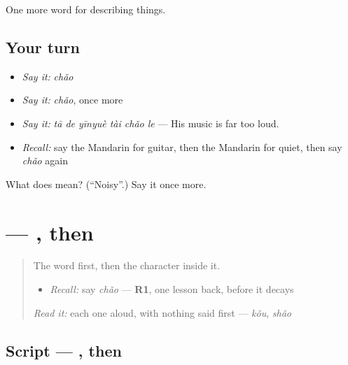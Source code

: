 \begin{grammarlens}[title={What you've built}]
One more word for describing things.
\end{grammarlens}

\subsection*{Your turn}
\begin{itemize}
\raggedright
  \item \emph{Say it:} \emph{chǎo}
  \item \emph{Say it:} \emph{chǎo}, once more
  \item \emph{Say it:} \emph{tā de yīnyuè tài chǎo le} — His music is far too loud.
  \item \emph{Recall:} say the Mandarin for guitar, then the Mandarin for quiet, then say \emph{chǎo} again
\end{itemize}

\begin{tcolorbox}[breakable,colback=teal!4,colframe=teal!35!black,title={Before you move on}]
What does  mean? (\textquotedblleft{}Noisy\textquotedblright{}.) Say it once more.
\end{tcolorbox}
\section[\texorpdfstring{\zh{吵} (chǎo)}{吵 (chǎo)}]{ — , then }

\label{lesson:ZH-W129-chao-noisy}



\begin{quote}
The word first, then the character inside it.

\begin{itemize}
\raggedright
  \item \emph{Recall:} say \emph{chǎo} — \textbf{R1}, one lesson back, before it decays
\end{itemize}

\begin{quote}
 
\end{quote}

\emph{Read it:} each one aloud, with nothing said first — \emph{kǒu}, \emph{shǎo}
\end{quote}

\subsection*{Script — , then }

